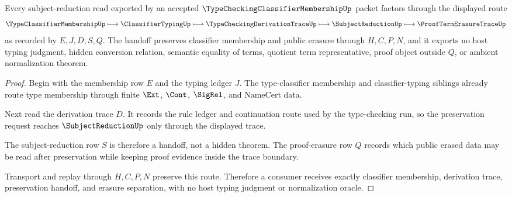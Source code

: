 \begin{theorem}
\label{thm:type-checking-classifier-membership-subject-reduction-handoff}
Every subject-reduction read exported by an accepted $\TypeCheckingClassifierMembershipUp$ packet factors through the displayed route
$$
\TypeClassifierMembershipUp \longmapsto \ClassifierTypingUp \longmapsto \TypeCheckingDerivationTraceUp \longmapsto \SubjectReductionUp \longmapsto \ProofTermErasureTraceUp
$$
as recorded by $E,J,D,S,Q$. The handoff preserves classifier membership and public erasure through $H,C,P,N$, and it exports no host typing judgment, hidden conversion relation, semantic equality of terms, quotient term representative, proof object outside $Q$, or ambient normalization theorem.
\end{theorem}
\begin{proof}
Begin with the membership row $E$ and the typing ledger $J$. The type-classifier membership and classifier-typing siblings already route type membership through finite $\Ext$, $\Cont$, $\SigRel$, and NameCert data.

Next read the derivation trace $D$. It records the rule ledger and continuation route used by the type-checking run, so the preservation request reaches $\SubjectReductionUp$ only through the displayed trace.

The subject-reduction row $S$ is therefore a handoff, not a hidden theorem. The proof-erasure row $Q$ records which public erased data may be read after preservation while keeping proof evidence inside the trace boundary.

Transport and replay through $H,C,P,N$ preserve this route. Therefore a consumer receives exactly classifier membership, derivation trace, preservation handoff, and erasure separation, with no host typing judgment or normalization oracle.
\end{proof}



